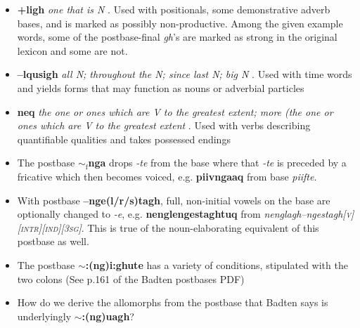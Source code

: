 \documentclass{article}
\begin{document}
\begin{itemize}
\item \textbf{+ligh} \textit{one that is N} . Used with positionals, some demonstrative adverb bases, and is marked as possibly non-productive. Among the given example words, some of the postbase-final \textit{gh}'s are marked as                                                                                                                                                                                                                                                                                                                                                                                                                                                                                                                                                                                                                                                           strong in the original lexicon and some are not.

\item \textbf{--lqusigh} \textit{all N; throughout the N; since last N; big N} . Used with time words and yields forms that may function as nouns or adverbial particles

\item \textbf{neq} \textit{the one or ones which are V to the greatest extent; more (the one or ones which are V to the greatest extent} . Used with verbs describing quantifiable qualities and takes possessed endings

\item The postbase \textbf{$\sim_\text{f}$nga} drops \textit{-te} from the base where
that \textit{-te} is preceded by a fricative which then becomes voiced, e.g. \textbf{piivngaaq} from base \textit{piifte}.

\item With postbase \textbf{--nge(l/r/s)tagh}, full, non-initial vowels on the base are optionally changed to \textit{-e}, e.g. \textbf{nenglengestaghtuq} from \textit{nenglagh--ngestagh\textsc{[v][intr][ind][3sg]}}. This is true of the noun-elaborating equivalent of this postbase as well.

\item The postbase \textbf{$\sim$:(ng)i:ghute} has a variety of conditions, stipulated with the two colons (See p.161 of the Badten postbases PDF)

\item How do we derive the allomorphs from the postbase that Badten says is underlyingly \textbf{$\sim$:(ng)uagh}?


\end{itemize}
\end{document}
